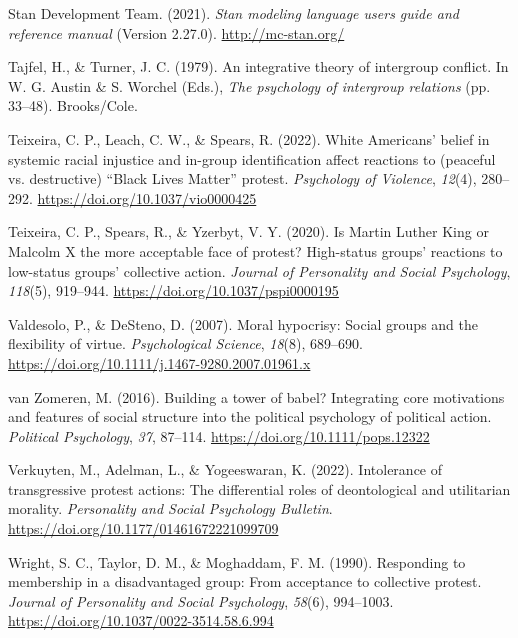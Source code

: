 \documentclass[twocolumn, 11pt, letterpaper]{article}
\newenvironment{CSLReferences}[2]{}{}
\begin{document}
\begin{CSLReferences}{1}{0}
\leavevmode{}%
Stan Development Team. (2021). \emph{Stan modeling language users guide
and reference manual} (Version 2.27.0). \url{http://mc-stan.org/}

\leavevmode{}%
Tajfel, H., \& Turner, J. C. (1979). An integrative theory of intergroup
conflict. In W. G. Austin \& S. Worchel (Eds.), \emph{The psychology of
intergroup relations} (pp. 33--48). Brooks/Cole.

\leavevmode{}%
Teixeira, C. P., Leach, C. W., \& Spears, R. (2022). White {Americans}'
belief in systemic racial injustice and in-group identification affect
reactions to ({peaceful} vs. {destructive}) {``{Black Lives Matter}''}
protest. \emph{Psychology of Violence}, \emph{12}(4), 280--292.
\url{https://doi.org/10.1037/vio0000425}

\leavevmode{}%
Teixeira, C. P., Spears, R., \& Yzerbyt, V. Y. (2020). Is {Martin}
{Luther} {King} or {Malcolm} {X} the more acceptable face of protest?
{High}-status groups' reactions to low-status groups' collective action.
\emph{Journal of Personality and Social Psychology}, \emph{118}(5),
919--944. \url{https://doi.org/10.1037/pspi0000195}

\leavevmode{}%
Valdesolo, P., \& DeSteno, D. (2007). Moral hypocrisy: Social groups and
the flexibility of virtue. \emph{Psychological Science}, \emph{18}(8),
689--690. \url{https://doi.org/10.1111/j.1467-9280.2007.01961.x}

\leavevmode{}%
van Zomeren, M. (2016). Building a tower of babel? {Integrating} core
motivations and features of social structure into the political
psychology of political action. \emph{Political Psychology}, \emph{37},
87--114. \url{https://doi.org/10.1111/pops.12322}

\leavevmode{}%
Verkuyten, M., Adelman, L., \& Yogeeswaran, K. (2022). Intolerance of
transgressive protest actions: The differential roles of deontological
and utilitarian morality. \emph{Personality and Social Psychology
Bulletin}. \url{https://doi.org/10.1177/01461672221099709}

\leavevmode{}%
Wright, S. C., Taylor, D. M., \& Moghaddam, F. M. (1990). Responding to
membership in a disadvantaged group: From acceptance to collective
protest. \emph{Journal of Personality and Social Psychology},
\emph{58}(6), 994--1003.
\url{https://doi.org/10.1037/0022-3514.58.6.994}


\end{CSLReferences}
\end{document}
